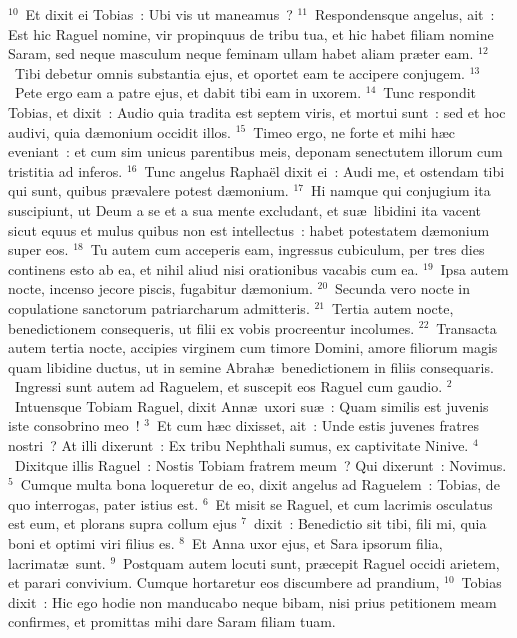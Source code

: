 ${}^{10}$~Et dixit ei Tobias~: Ubi vis ut maneamus~?
${}^{11}$~Respondensque angelus, ait~: Est hic Raguel nomine, vir propinquus de tribu tua, et hic habet filiam nomine Saram, sed neque masculum neque feminam ullam habet aliam pr\ae ter eam.
${}^{12}$~Tibi debetur omnis substantia ejus, et oportet eam te accipere conjugem.
${}^{13}$~Pete ergo eam a patre ejus, et dabit tibi eam in uxorem.
${}^{14}$~Tunc respondit Tobias, et dixit~: Audio quia tradita est septem viris, et mortui sunt~: sed et hoc audivi, quia d\ae monium occidit illos.
${}^{15}$~Timeo ergo, ne forte et mihi h\ae c eveniant~: et cum sim unicus parentibus meis, deponam senectutem illorum cum tristitia ad inferos.
${}^{16}$~Tunc angelus Rapha\"el dixit ei~: Audi me, et ostendam tibi qui sunt, quibus pr\ae valere potest d\ae monium.
${}^{17}$~Hi namque qui conjugium ita suscipiunt, ut Deum a se et a sua mente excludant, et su\ae\ libidini ita vacent sicut equus et mulus quibus non est intellectus~: habet potestatem d\ae monium super eos.
${}^{18}$~Tu autem cum acceperis eam, ingressus cubiculum, per tres dies continens esto ab ea, et nihil aliud nisi orationibus vacabis cum ea.
${}^{19}$~Ipsa autem nocte, incenso jecore piscis, fugabitur d\ae monium.
${}^{20}$~Secunda vero nocte in copulatione sanctorum patriarcharum admitteris.
${}^{21}$~Tertia autem nocte, benedictionem consequeris, ut filii ex vobis procreentur incolumes.
${}^{22}$~Transacta autem tertia nocte, accipies virginem cum timore Domini, amore filiorum magis quam libidine ductus, ut in semine Abrah\ae\ benedictionem in filiis consequaris.
~Ingressi sunt autem ad Raguelem, et suscepit eos Raguel cum gaudio.
${}^{2}$~Intuensque Tobiam Raguel, dixit Ann\ae\ uxori su\ae~: Quam similis est juvenis iste consobrino meo~!
${}^{3}$~Et cum h\ae c dixisset, ait~: Unde estis juvenes fratres nostri~? At illi dixerunt~: Ex tribu Nephthali sumus, ex captivitate Ninive.
${}^{4}$~Dixitque illis Raguel~: Nostis Tobiam fratrem meum~? Qui dixerunt~: Novimus.
${}^{5}$~Cumque multa bona loqueretur de eo, dixit angelus ad Raguelem~: Tobias, de quo interrogas, pater istius est.
${}^{6}$~Et misit se Raguel, et cum lacrimis osculatus est eum, et plorans supra collum ejus
${}^{7}$~dixit~: Benedictio sit tibi, fili mi, quia boni et optimi viri filius es.
${}^{8}$~Et Anna uxor ejus, et Sara ipsorum filia, lacrimat\ae\ sunt.
${}^{9}$~Postquam autem locuti sunt, pr\ae cepit Raguel occidi arietem, et parari convivium. Cumque hortaretur eos discumbere ad prandium,
${}^{10}$~Tobias dixit~: Hic ego hodie non manducabo neque bibam, nisi prius petitionem meam confirmes, et promittas mihi dare Saram filiam tuam.

